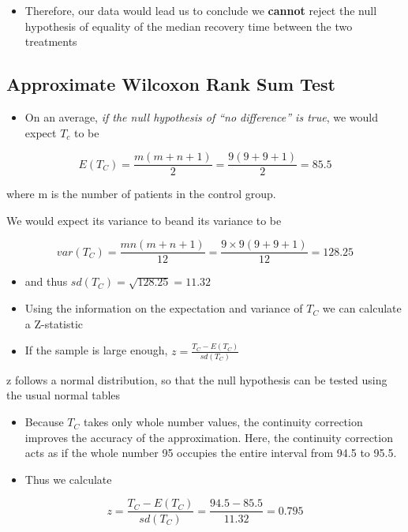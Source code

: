 \documentclass[
]{book}
\providecommand{\tightlist}{%
  \setlength{\itemsep}{0pt}\setlength{\parskip}{0pt}}
\begin{document}
\begin{itemize}
\tightlist
\item
  Therefore, our data would lead us to conclude we \textbf{cannot} reject the null hypothesis of equality of the median recovery time between the two treatments
\end{itemize}

\hypertarget{approximate-wilcoxon-rank-sum-test}{%
\subsection{Approximate Wilcoxon Rank Sum Test}\label{approximate-wilcoxon-rank-sum-test}}

\begin{itemize}
\tightlist
\item
  On an average, \emph{if the null hypothesis of ``no difference'' is true}, we would expect \(T_c\) to be
\end{itemize}

\[E(T_C)=\frac{m(m+n+1)}{2}=\frac{9(9+9+1)}{2}=85.5\]

where m is the number of patients in the control group.

We would expect its variance to beand its variance to be

\[var(T_C)=\frac{mn(m+n+1)}{12}=\frac{9\times 9(9+9+1)}{12}=128.25\]

\begin{itemize}
\tightlist
\item
  and thus \(sd(T_C)=\sqrt{128.25}=11.32\)
\item
  Using the information on the expectation and variance of \(T_C\) we can calculate a Z-statistic
\item
  If the sample is large enough, \(z=\frac{T_C-E(T_C)}{sd(T_C)}\)
\end{itemize}

z follows a normal distribution, so that the null hypothesis can be tested using the usual normal tables

\begin{itemize}
\tightlist
\item
  Because \(T_C\) takes only whole number values, the continuity correction improves the accuracy of the approximation. Here, the continuity correction acts as if the whole number 95 occupies the entire interval from 94.5 to 95.5.
\item
  Thus we calculate
\end{itemize}

\[z=\frac{T_C-E(T_C)}{sd(T_C)}=\frac{94.5-85.5}{11.32}=0.795\]
\end{document}
